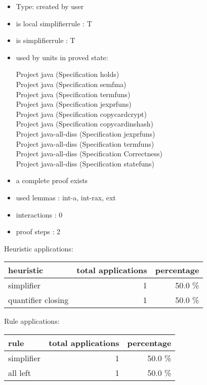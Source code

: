 \documentclass[a4paper]{article}
\begin{document}
\begin{itemize}

\item Type: created by user

\item is local simplifierrule : T
\item is simplifierrule : T
\item used by units in proved state:

Project java (Specification holds) \\
Project java (Specification semfma) \\
Project java (Specification termfuns) \\
Project java (Specification jexprfuns) \\
Project java (Specification copycardcrypt) \\
Project java (Specification copycardinshash) \\
Project java-all-diss (Specification jexprfuns) \\
Project java-all-diss (Specification termfuns) \\
Project java-all-diss (Specification Correctness) \\
Project java-all-diss (Specification statefuns)
\item       a complete proof exists
\item       used lemmas  : int-a, int-rax, ext
\item       interactions : 0
\item       proof steps  : 2
\end{itemize}

\medskip


Heuristic applications:

\begin{supertabular}{l|r|r}
heuristic	& total applications & percentage \\ \hline
simplifier & 1 & 50.0 \% \\
quantifier closing & 1 & 50.0 \% \\

\end{supertabular}

Rule applications:

\begin{supertabular}{l|r|r}
rule	        & total applications & percentage \\ \hline
simplifier & 1 & 50.0 \% \\
all left & 1 & 50.0 \% \\

\end{supertabular}
\end{document}
